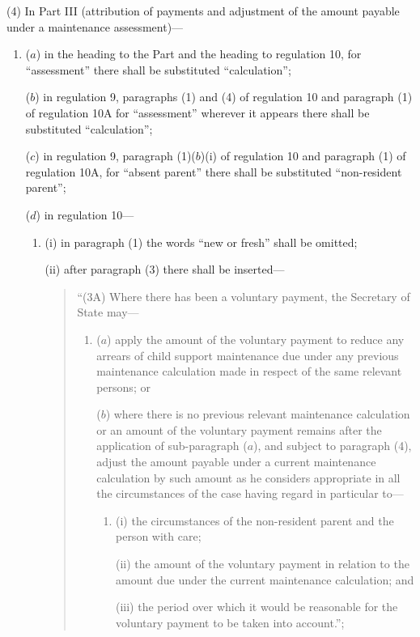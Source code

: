 \documentclass[12pt,a4paper]{article}
\begin{document}
(4) In Part III (attribution of payments and adjustment of the amount payable under a maintenance assessment)—
\begin{enumerate}\item[]
($a$) in the heading to the Part and the heading to regulation 10, for “assessment” there shall be substituted “calculation”;

($b$) in regulation 9, paragraphs (1) and (4) of regulation 10 and paragraph (1) of regulation 10A for “assessment” wherever it appears there shall be substituted “calculation”;

($c$) in regulation 9, paragraph (1)($b$)(i)  of regulation 10 and paragraph (1) of regulation 10A, for “absent parent” there shall be substituted “non-resident parent”;

($d$) in regulation 10—
\begin{enumerate}\item[]
(i) in paragraph (1) the words “new or fresh” shall be omitted;

(ii) after paragraph (3) there shall be inserted—
\begin{quotation}
“(3A) Where there has been a voluntary payment, the Secretary of State may—
\begin{enumerate}\item[]
($a$) apply the amount of the voluntary payment to reduce any arrears of child support maintenance due under any previous maintenance calculation made in respect of the same relevant persons; or

($b$) where there is no previous relevant maintenance calculation or an amount of the voluntary payment remains after the application of sub-paragraph ($a$), and subject to paragraph (4), adjust the amount payable under a current maintenance calculation by such amount as he considers appropriate in all the circumstances of the case having regard in particular to—
\begin{enumerate}\item[]
(i) the circumstances of the non-resident parent and the person with care;

(ii) the amount of the voluntary payment in relation to the amount due under the current maintenance calculation; and

(iii) the period over which it would be reasonable for the voluntary payment to be taken into account.”;
\end{enumerate}
\end{enumerate}
\end{quotation}


\end{enumerate}
\end{enumerate}
\end{document}
